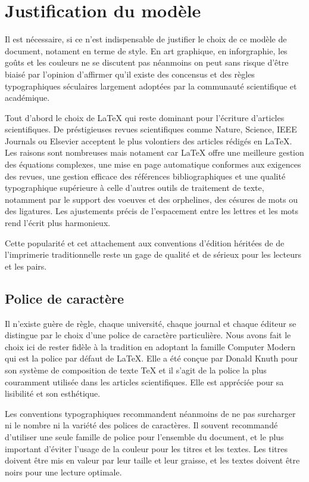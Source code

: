 \chapter{Justification du modèle}

Il est nécessaire, si ce n'est indispensable de justifier le choix de ce modèle de document, notament en terme de style. En art graphique, en inforgraphie, les goûts et les couleurs ne se discutent pas néanmoins on peut sans risque d'être biaisé par l'opinion d'affirmer qu'il existe des concensus et des règles typographiques séculaires largement adoptées par la communauté scientifique et académique.

Tout d'abord le choix de \LaTeX{} qui reste dominant pour l'écriture d'articles scientifiques. De préstigieuses revues scientifiques comme Nature, Science, IEEE Journals ou Elsevier acceptent le plus volontiers des articles rédigés en \LaTeX{}. Les raisons sont nombreuses mais notament car \LaTeX{} offre une meilleure gestion des équations complexes, une mise en page automatique conformes aux exigences des revues, une gestion efficace des références bibliographiques et une qualité typographique supérieure à celle d'autres outils de traitement de texte, notamment par le support des voeuves et des orphelines, des césures de mots ou des ligatures. Les ajustements précis de l'espacement entre les lettres et les mots rend l'écrit plus harmonieux.

Cette popularité et cet attachement aux conventions d'édition héritées de de l'imprimerie traditionnelle reste un gage de qualité et de sérieux pour les lecteurs et les pairs.

\section{Police de caractère}

Il n'existe guère de règle, chaque université, chaque journal et chaque éditeur se distingue par le choix d'une police de caractère particulière. Nous avons fait le choix ici de rester fidèle à la tradition en adoptant la famille Computer Modern qui est la police par défaut de \LaTeX{}. Elle a été conçue par Donald Knuth pour son système de composition de texte \TeX{} et il s'agit de la police la plus couramment utilisée dans les articles scientifiques. Elle est appréciée pour sa lisibilité et son esthétique.

Les conventions typographiques recommandent néanmoins de ne pas surcharger ni le nombre ni la variété des polices de caractères. Il souvent recommandé d'utiliser une seule famille de police pour l'ensemble du document, et le plus important d'éviter l'usage de la couleur pour les titres et les textes. Les titres doivent être mis en valeur par leur taille et leur graisse, et les textes doivent être noirs pour une lecture optimale.

